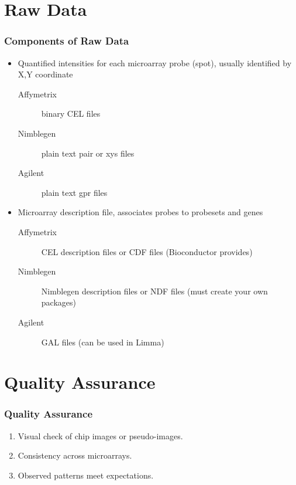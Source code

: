 \documentclass[pdf]{beamer}
\begin{document}
\section{Raw Data}
\begin{frame} 
  \frametitle{Components of Raw Data}
  \begin{itemize}
    \item Quantified intensities for each microarray probe (spot), usually identified by X,Y coordinate
    \begin{description}
      \item[Affymetrix] binary CEL files
      \item[Nimblegen] plain text pair or xys files
      \item[Agilent] plain text gpr files 
    \end{description}
    \item Microarray description file, associates probes to probesets and genes
    \begin{description}
      \item[Affymetrix] CEL description files or CDF files (Bioconductor provides)
      \item[Nimblegen] Nimblegen description files or NDF files (must create your own packages)
      \item[Agilent] GAL files (can be used in Limma)
    \end{description}
  \end{itemize}
\end{frame}

%
\section{Quality Assurance}
\begin{frame}
  \frametitle{Quality Assurance}
  \begin{enumerate}
    \item Visual check of chip images or pseudo-images.
    \item Consistency across microarrays.
    \item Observed patterns meet expectations.
  \end{enumerate}
\end{frame}
\end{document}
